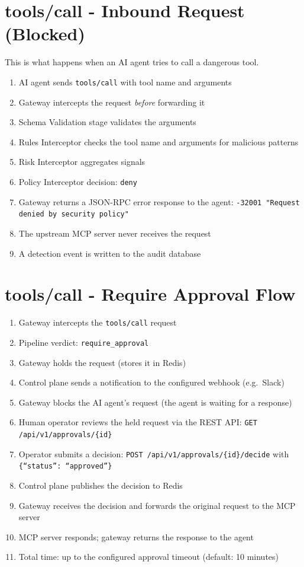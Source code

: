\documentclass[12pt,a4paper]{report}
\begin{document}
\section{tools/call - Inbound Request (Blocked)}

This is what happens when an AI agent tries to call a dangerous tool.

\begin{enumerate}
  \item AI agent sends \texttt{tools/call} with tool name and arguments
  \item Gateway intercepts the request \textit{before} forwarding it
  \item Schema Validation stage validates the arguments
  \item Rules Interceptor checks the tool name and arguments for malicious patterns
  \item Risk Interceptor aggregates signals
  \item Policy Interceptor decision: \texttt{deny}
  \item Gateway returns a JSON-RPC error response to the agent:
    \texttt{-32001 "Request denied by security policy"}
  \item The upstream MCP server never receives the request
  \item A detection event is written to the audit database
\end{enumerate}

\section{tools/call - Require Approval Flow}

\begin{enumerate}
  \item Gateway intercepts the \texttt{tools/call} request
  \item Pipeline verdict: \texttt{require\_approval}
  \item Gateway holds the request (stores it in Redis)
  \item Control plane sends a notification to the configured webhook (e.g.\ Slack)
  \item Gateway blocks the AI agent's request (the agent is waiting for a response)
  \item Human operator reviews the held request via the REST API:
    \texttt{GET /api/v1/approvals/\{id\}}
  \item Operator submits a decision:
    \texttt{POST /api/v1/approvals/\{id\}/decide} with \texttt{\{``status'': ``approved''\}}
  \item Control plane publishes the decision to Redis
  \item Gateway receives the decision and forwards the original request to the MCP server
  \item MCP server responds; gateway returns the response to the agent
  \item Total time: up to the configured approval timeout (default: 10 minutes)
\end{enumerate}
\end{document}
